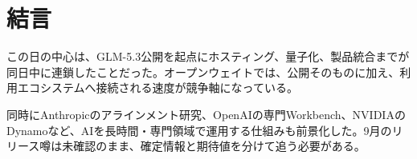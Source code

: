 \section*{結言}
この日の中心は、GLM-5.3公開を起点にホスティング、量子化、製品統合までが同日中に連鎖したことだった。オープンウェイトでは、公開そのものに加え、利用エコシステムへ接続される速度が競争軸になっている。

同時にAnthropicのアラインメント研究、OpenAIの専門Workbench、NVIDIAのDynamoなど、AIを長時間・専門領域で運用する仕組みも前景化した。9月のリリース噂は未確認のまま、確定情報と期待値を分けて追う必要がある。
